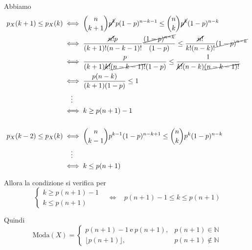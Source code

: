 \begin{enumerate}
Abbiamo
\begin{align*}
p_{X}( k+1) \leq p_{X}( k) & \iff \binom{n}{k+1}\cancel{p^{k}} p( 1-p)^{n-k-1} \leq \binom{n}{k}\cancel{p^{k}}( 1-p)^{n-k}\\
 & \iff \frac{\cancel{n!} p}{( k+1) !( n-k-1) !}\frac{\cancel{( 1-p)^{n-k}}}{( 1-p)} \leq \frac{\cancel{n!}}{k!( n-k) !}\cancel{( 1-p)^{n-k}}\\
 & \iff \frac{p}{( k+1)\cancel{k!}\cancel{( n-k-1) !}( 1-p)} \leq \frac{1}{\cancel{k!}( n-k)\cancel{( n-k-1) !}}\\
 & \iff \frac{p( n-k)}{( k+1)( 1-p)} \leq 1\\
 & \quad\vdots \\
 & \iff k\geq p( n+1) -1\\
 & \\
p_{X}( k-2) \leq p_{X}( k) & \iff \binom{n}{k-1} p^{k-1}( 1-p)^{n-k+1} \leq \binom{n}{k} p^{k}( 1-p)^{n-k}\\
 & \quad\vdots \\
 & \iff k\leq p( n+1)
\end{align*}

Allora la condizione si verifica per
\begin{equation*}
\begin{cases}
k\geq p( n+1) -1\\
k\leq p( n+1)
\end{cases}
 \ \ \ \ \iff \ \ \ \ p( n+1) -1\leq k\leq p( n+1)
\end{equation*}

Quindi
\begin{equation*}
\text{Moda}( X) =\begin{cases}
p( n+1) -1\ \text{e} \ p( n+1) , & p( n+1) \in \mathbb{N}\\
\lfloor p( n+1)\rfloor , & p( n+1) \notin \mathbb{N}
\end{cases}
\end{equation*}
\end{enumerate}
\Soluzione

